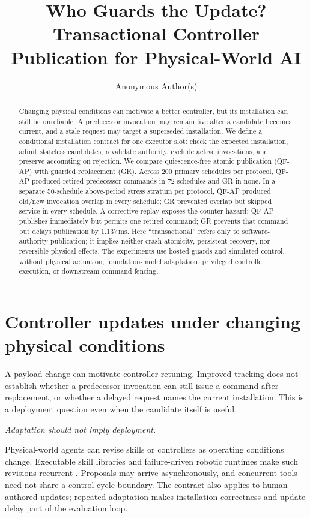 \documentclass{article}
\title{Who Guards the Update? Transactional Controller Publication for Physical-World AI}
\author{Anonymous Author(s)}
\begin{document}
\maketitle
\begin{abstract}
Changing physical conditions can motivate a better controller, but its installation can still be unreliable. A predecessor invocation may remain live after a candidate becomes current, and a stale request may target a superseded installation. We define a conditional installation contract for one executor slot: check the expected installation, admit stateless candidates, revalidate authority, exclude active invocations, and preserve accounting on rejection. We compare quiescence-free atomic publication (QF-AP) with guarded replacement (GR). Across 200 primary schedules per protocol, QF-AP produced retired predecessor commands in 72 schedules and GR in none. In a separate 50-schedule above-period stress stratum per protocol, QF-AP produced old/new invocation overlap in every schedule; GR prevented overlap but skipped service in every schedule. A corrective replay exposes the counter-hazard: QF-AP publishes immediately but permits one retired command; GR prevents that command but delays publication by 1.137\,ms. Here ``transactional'' refers only to software-authority publication; it implies neither crash atomicity, persistent recovery, nor reversible physical effects. The experiments use hosted guards and simulated control, without physical actuation, foundation-model adaptation, privileged controller execution, or downstream command fencing.
\end{abstract}

\section{Controller updates under changing physical conditions}
A payload change can motivate controller retuning. Improved tracking does not establish whether a predecessor invocation can still issue a command after replacement, or whether a delayed request names the current installation. This is a deployment question even when the candidate itself is useful.

\emph{Adaptation should not imply deployment.}

Physical-world agents can revise skills or controllers as operating conditions change. Executable skill libraries and failure-driven robotic runtimes make such revisions recurrent \citep{wang2023voyager,tian2026abot}. Proposals may arrive asynchronously, and concurrent tools need not share a control-cycle boundary. The contract also applies to human-authored updates; repeated adaptation makes installation correctness and update delay part of the evaluation loop.
\end{document}
